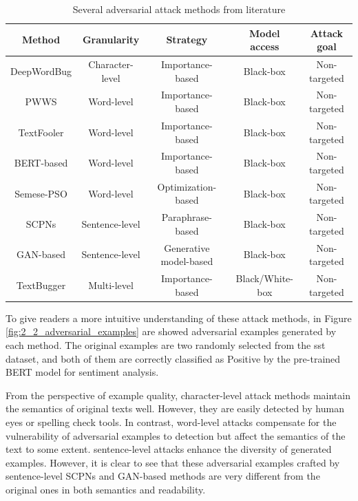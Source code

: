 \begin{table}[h]
  \footnotesize
  \centering
  \begin{tabular}{|c||c|c|c|c|}
    \hline
    Method & Granularity & Strategy & Model access & Attack goal \\
    \hline \hline
    DeepWordBug & Character-level & Importance-based & Black-box & Non-targeted \\ 
    
    PWWS & Word-level & Importance-based & Black-box & Non-targeted \\
    
    TextFooler & Word-level & Importance-based & Black-box & Non-targeted \\
    
    BERT-based & Word-level & Importance-based & Black-box & Non-targeted \\
    
    Semese-PSO & Word-level & Optimization-based & Black-box & Non-targeted \\
    
    SCPNs & Sentence-level & Paraphrase-based & Black-box & Non-targeted \\
    
    GAN-based & Sentence-level & Generative model-based & Black-box & Non-targeted \\
    
    TextBugger & Multi-level & Importance-based & Black/White-box & Non-targeted \\
    \hline
  \end{tabular}
  \caption{Several adversarial attack methods from literature}
\label{tab:attack-methods}
\end{table}


To give readers a more intuitive understanding of these attack
methods, in Figure \ref{fig:2_2_adversarial_examples} are showed adversarial examples generated by each method. 
The original examples are two randomly selected from the \acrfull{sst} dataset, and both of them are correctly classified as Positive by the pre-trained BERT model for sentiment analysis.

From the perspective of example quality, character-level attack
methods maintain the semantics of original texts well. However, they are easily detected by human eyes or spelling check tools.
In contrast, word-level attacks compensate for the vulnerability of adversarial examples to detection but affect the semantics of the text to some extent.
sentence-level attacks enhance the diversity of generated examples. However, it is clear to see that these adversarial examples crafted by sentence-level SCPNs and GAN-based methods are very different from the original ones in both semantics and readability. 

